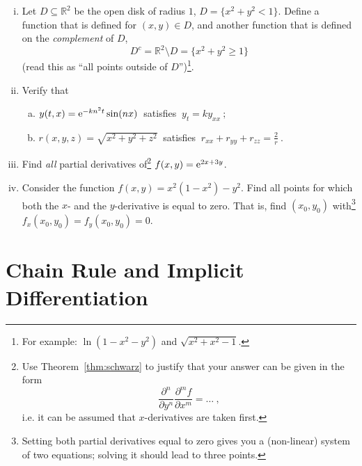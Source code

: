 \begin{exercise}
\begin{enumerate}[(i)]
		\item Let $D\subseteq\mathbb{R}^2$ be the open disk of radius $1$, $D = \{x^2 + y^2 < 1\}$. Define a function that is defined for $(x,y) \in D$, and another function that is defined on the \emph{complement} of $D$,
	\[D^c = \mathbb{R}^2 \setminus D = \{x^2+y^2 \geq 1 \} \]
	(read this as ``all points outside of $D$'')\footnote{For example: $\ln(1-x^2-y^2)$ and $\sqrt{x^2+x^2-1}$\:.}.
	\item Verify that
	\begin{enumerate}[(a)]
		\item $y(t,x) = \mathrm{e}^{-kn^2t}\sin(nx) \:$ satisfies $\: y_t=ky_{xx} \:;$
		\item $r(x,y,z) = \sqrt{x^2+y^2+z^2} \:$ satisfies
		$\: r_{xx}+r_{yy}+r_{zz} = \tfrac{2}{r} \:.$
	\end{enumerate}
	\item Find \emph{all} partial derivatives of\footnote{Use Theorem~\ref{thm:schwarz} to justify that your answer can be given in the form \[\frac{\partial^n}{\partial y^n} \frac{\partial^m f}{\partial x^m}=\dots \:, \] i.e. it can be assumed that $x$-derivatives are taken first.} $f(x,y) = \mathrm{e}^{2x+3y}$.
	\item Consider the function $f(x,y)=x^2(1-x^2)-y^2$. Find all points for which both the $x$- and the $y$-derivative is equal to zero. That is, find $(x_0,y_0)$ with\footnote{Setting both partial derivatives equal to zero gives you a (non-linear) system of two equations; solving it should lead to three points.} $f_x(x_0,y_0)=f_y(x_0,y_0)=0$.
\end{enumerate}
\end{exercise}


\section{Chain Rule and Implicit Differentiation}

